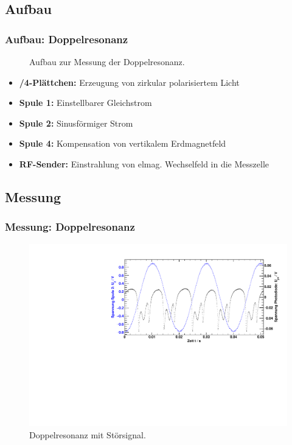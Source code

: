 \subsection{Aufbau}
\begin{frame}
\frametitle{Aufbau: Doppelresonanz}

\begin{figure}
    \centering
    \def\svgwidth{\textwidth}
    
    \caption{Aufbau zur Messung der Doppelresonanz.}
\end{figure}

\begin{itemize}
  \item \textbf{\textlambda/4-Plättchen:} Erzeugung von zirkular polarisiertem Licht
  \item \textbf{Spule 1:} Einstellbarer Gleichstrom
  \item \textbf{Spule 2:} Sinusförmiger Strom
  \item \textbf{Spule 4:} Kompensation von vertikalem Erdmagnetfeld
  \item \textbf{RF-Sender:} Einstrahlung von elmag. Wechselfeld in die Messzelle
\end{itemize}

\end{frame}

\subsection{Messung}

\begin{frame}
\frametitle{Messung: Doppelresonanz}
\begin{figure}
    \begin{center}
        \includegraphics[width=\textwidth]{../img/06.pdf}
        \caption{Doppelresonanz mit Störsignal.}
        \label{img:dehmeltrf}
    \end{center}
\end{figure}
\end{frame}


